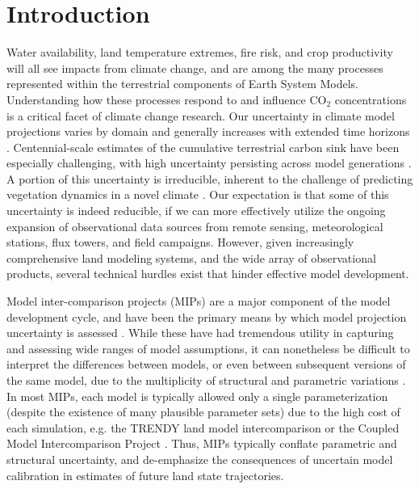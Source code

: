 \documentclass[draft]{agujournal2019}
\begin{document}
\begin{abstract}
[ enter your Abstract here ]
\end{abstract}


\section{Introduction}
Water availability, land temperature extremes, fire risk, and crop productivity will all see impacts from climate change, and are among the many processes represented within the terrestrial components of Earth System Models. Understanding how these processes respond to and influence CO$_2$ concentrations is a critical facet of climate change research. Our uncertainty in climate model projections varies by domain and generally increases with extended time horizons \cite{koven2022}. Centennial-scale estimates of the cumulative terrestrial carbon sink have been especially challenging, with high uncertainty persisting across model generations \cite{friedlingstein2014,arora2020}. A portion of this uncertainty is irreducible, inherent to the challenge of predicting vegetation dynamics in a novel climate \cite{lovenduski2017}. Our expectation is that some of this uncertainty is indeed reducible, if we can more effectively utilize the ongoing expansion of observational data sources from remote sensing, meteorological stations, flux towers, and field campaigns. However, given increasingly comprehensive land modeling systems, and the wide array of observational products, several technical hurdles exist that hinder effective model development.

Model inter-comparison projects (MIPs) are a major component of the model development cycle, and have been the primary means by which model projection uncertainty is assessed \cite{henderson-sellers1995,pitman1999,wood1998,schlosser2000,eyring2016,friedlingstein2022}. While these have had tremendous utility in capturing and assessing wide ranges of model assumptions, it can nonetheless be difficult to interpret the differences between models, or even between subsequent versions of the same model, due to the multiplicity of structural and parametric variations \cite{mcneall2016}. In most MIPs, each model is typically allowed only a single parameterization (despite the existence of many plausible parameter sets) due to the high cost of each simulation, e.g. the TRENDY land model intercomparison or the Coupled Model Intercomparison Project \cite{friedlingstein2022,eyring2016}. Thus, MIPs typically conflate parametric and structural uncertainty, and de-emphasize the consequences of uncertain model calibration in estimates of future land state trajectories. 
\end{document}
